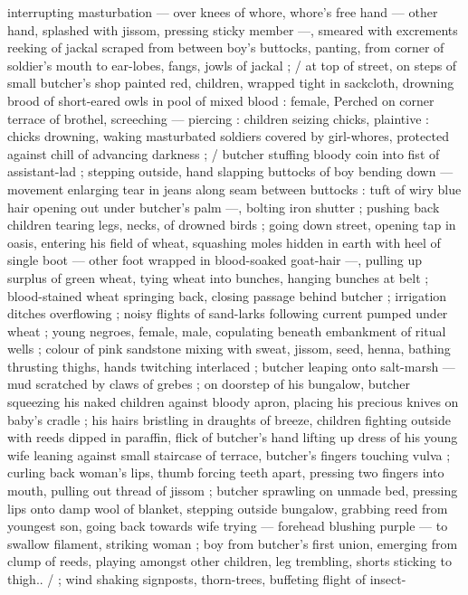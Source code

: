 interrupting masturbation --- over knees of whore, whore’s free
hand --- other hand, splashed with jissom, pressing sticky member
---, smeared with excrements reeking of jackal scraped from
between boy's buttocks, panting, from corner of soldier's mouth to
ear-lobes, fangs, jowls of jackal ; / at top of street, on steps of small
butcher's shop painted red, children, wrapped tight in sackcloth,
drowning brood of short-eared owls in pool of mixed blood : female,
Perched on corner terrace of brothel, screeching --- piercing :
children seizing chicks, plaintive : chicks drowning, waking
masturbated soldiers covered by girl-whores, protected against chill
of advancing darkness ; / butcher stuffing bloody coin into fist of
assistant-lad ; stepping outside, hand slapping buttocks of boy
bending down --- movement enlarging tear in jeans along seam
between buttocks : tuft of wiry blue hair opening out under butcher's
palm ---, bolting iron shutter ; pushing back children tearing legs,
necks, of drowned birds ; going down street, opening tap in oasis,
entering his field of wheat, squashing moles hidden in earth with
heel of single boot --- other foot wrapped in blood-soaked goat-hair
---, pulling up surplus of green wheat, tying wheat into bunches,
hanging bunches at belt ; blood-stained wheat springing back,
closing passage behind butcher ; irrigation ditches overflowing ;
noisy flights of sand-larks following current pumped under wheat ;
young negroes, female, male, copulating beneath embankment of
ritual wells ; colour of pink sandstone mixing with sweat, jissom,
seed, henna, bathing thrusting thighs, hands twitching interlaced ;
butcher leaping onto salt-marsh --- mud scratched by claws of
grebes ; on doorstep of his bungalow, butcher squeezing his naked
children against bloody apron, placing his precious knives on baby's
cradle ; his hairs bristling in draughts of breeze, children fighting
outside with reeds dipped in paraffin, flick of butcher's hand lifting
up dress of his young wife leaning against small staircase of terrace,
butcher's fingers touching vulva ; curling back woman's lips, thumb
forcing teeth apart, pressing two fingers into mouth, pulling out
thread of jissom ; butcher sprawling on unmade bed, pressing lips
onto damp wool of blanket, stepping outside bungalow, grabbing
reed from youngest son, going back towards wife trying --- forehead
blushing purple --- to swallow filament, striking woman ; boy from
butcher's first union, emerging from clump of reeds, playing
amongst other children, leg trembling, shorts sticking to thigh.. / ;
wind shaking signposts, thorn-trees, buffeting flight of insect-
